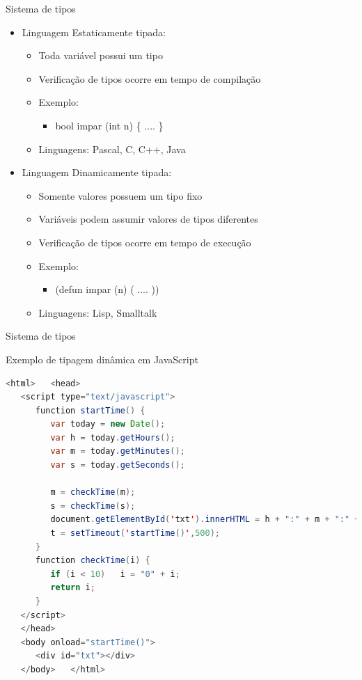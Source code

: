 \documentclass[handout]{beamer}
\begin{document}
\begin{frame}{Sistema de tipos}

   \begin{itemize}
   \item Linguagem Estaticamente tipada:
      \begin{itemize}
      \item Toda variável possui um tipo
      \item Verificação de tipos ocorre em tempo de compilação
      \item Exemplo:
         \begin{itemize}
         \item bool impar (int n) \{ .... \}
         \end{itemize}
      \item Linguagens: Pascal, C, C++, Java
      \end{itemize}
   \item Linguagem Dinamicamente tipada:
      \begin{itemize}
      \item Somente valores possuem um tipo fixo
      \item Variáveis podem assumir valores de tipos diferentes
      \item Verificação de tipos ocorre em tempo de execução
      \item Exemplo:
         \begin{itemize}
         \item (defun impar (n) ( .... ))
         \end{itemize}
      \item Linguagens: Lisp, Smalltalk
      \end{itemize}
   \end{itemize}
\end{frame}

\begin{frame}[fragile]{Sistema de tipos}
\begin{block}{Exemplo de tipagem dinâmica em JavaScript}
	\begin{lstlisting}[language=Java,numbers=none,basicstyle=\tiny,]
   <html>   <head>
   <script type="text/javascript">
      function startTime() {
         var today = new Date();
         var h = today.getHours();
         var m = today.getMinutes();
         var s = today.getSeconds();

         m = checkTime(m);
         s = checkTime(s);
         document.getElementById('txt').innerHTML = h + ":" + m + ":" + s;
         t = setTimeout('startTime()',500);
      }
      function checkTime(i) {
         if (i < 10)   i = "0" + i;
         return i;
      }
   </script>
   </head>
   <body onload="startTime()">
      <div id="txt"></div>
   </body>   </html>
\end{lstlisting}
\end{block}
\end{frame}
\end{document}
